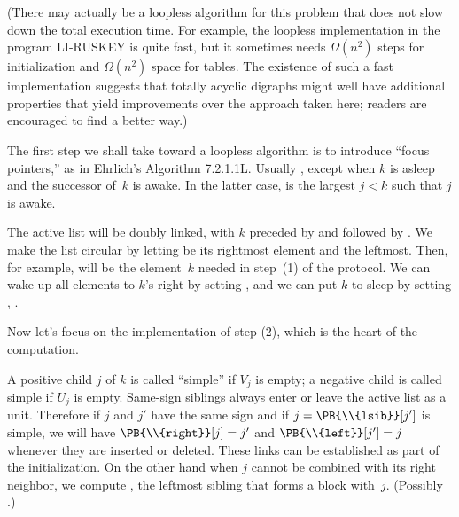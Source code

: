 (There may actually be a loopless algorithm for this problem that does not
slow down the total execution time. For example, the loopless implementation
in the program {\mc LI-RUSKEY} is quite fast, but it sometimes needs
$\Omega(n^2)$ steps for initialization and $\Omega(n^2)$ space for tables.
The existence of such a fast implementation suggests that
totally acyclic digraphs might well have additional properties that
yield improvements over the approach taken here; readers are encouraged to
find a better way.)

The first step we shall take toward a loopless algorithm is to introduce
``focus pointers,'' as in Ehrlich's Algorithm 7.2.1.1L. Usually ,
except when $k$ is asleep and the successor of~$k$ is awake. In the latter
case,  is the largest $j<k$ such that $j$ is awake.

The active list will be doubly linked, with $k$ preceded by 
and
followed by . We make the list circular by letting  be its
rightmost element and  the leftmost. Then, for example,
 will be the element~$k$ needed in step~(1) of
the protocol.
We can wake up all elements to $k$'s right by setting
, and we can put $k$ to sleep
by setting
, .

\fi

Now let's focus on the implementation of step (2), which is the
heart of the computation.

A positive child $j$ of $k$ is called ``simple'' if $V_j$ is empty; a
negative child is called simple if $U_j$ is empty. Same-sign siblings always
enter or leave the active list as a unit. Therefore if $j$ and $j'$ have the
same sign and if $j=\PB{\\{lsib}}[j']$ is simple,  we will have $\PB{%
\\{right}}[j]=j'$ and
$\PB{\\{left}}[j']=j$ whenever they are inserted or deleted. These links can be
established as part of the initialization. On the other hand when $j$
cannot be combined with its right neighbor, we compute ,
the
leftmost sibling that forms a block with~$j$. (Possibly .)

